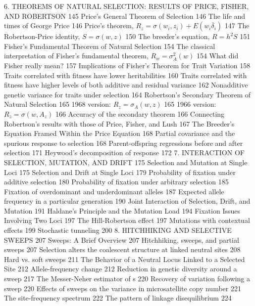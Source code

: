\documentclass{article}
\begin{document}
6. THEOREMS OF NATURAL SELECTION:
RESULTS OF PRICE, FISHER, AND ROBERTSON 145
Price's General Theorem of Selection 146
The life and times of George Price 146
Price's theorem,  $ R_{z} = \sigma(w_{i}, z_{i}) + E(w_{i} \overline{\delta}_{i}) $ 147
The Robertson-Price identity,  $ S = \sigma(w, z) $ 150
The breeder's equation,  $ R = h^{2}S $ 151
Fisher's Fundamental Theorem of Natural Selection 154
The classical interpretation of Fisher's fundamental theorem,  $ R_{w} = \sigma_{A}^{2}(w) $ 154
What did Fisher really mean? 157
Implications of Fisher's Theorem for Trait Variation 158
Traits correlated with fitness have lower heritabilities 160
Traits correlated with fitness have higher levels of both
additive and residual variance 162
Nonadditive genetic variance for traits under selection 164
Robertson's Secondary Theorem of Natural Selection 165
1968 version:  $ R_{z} = \sigma_{A}(w, z) $ 165
1966 version:  $ R_{z} = \sigma(w, A_{z}) $ 166
Accuracy of the secondary theorem 166
Connecting Robertson's results with those of Price, Fisher, and Lush 167
The Breeder's Equation Framed Within the Price Equation 168
Partial covariance and the spurious response to selection 168
Parent-offspring regressions before and after selection 171
Heywood's decomposition of response 172
7. INTERACTION OF SELECTION, MUTATION, AND DRIFT 175
Selection and Mutation at Single Loci 175
Selection and Drift at Single Loci 179
Probability of fixation under additive selection 180
Probability of fixation under arbitrary selection 185
Fixation of overdominant and underdominant alleles 187
Expected allele frequency in a particular generation 190
Joint Interaction of Selection, Drift, and Mutation 191
Haldane's Principle and the Mutation Load 194
Fixation Issues Involving Two Loci 197
The Hill-Robertson effect 197
Mutations with contextual effects 199
Stochastic tunneling 200
8. HITCHHIKING AND SELECTIVE SWEEPS 207
Sweeps: A Brief Overview 207
Hitchhiking, sweeps, and partial sweeps 207
Selection alters the coalescent structure at linked neutral sites 208
Hard vs. soft sweeps 211
The Behavior of a Neutral Locus Linked to a Selected Site 212
Allele-frequency change 212
Reduction in genetic diversity around a sweep 217
The Messer-Neher estimator of s 220
Recovery of variation following a sweep 220
Effects of sweeps on the variance in microsatellite copy number 221
The site-frequency spectrum 222
The pattern of linkage disequilibrium 224
\end{document}
